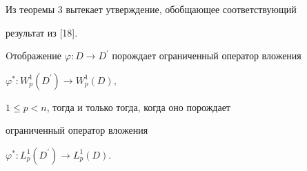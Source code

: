 Из теоремы 3 вытекает утверждение, обобщающее соответствующий


результат из [18].





\begin{cor}


Oтображение $\varphi : D\to


D^{\prime}$ порождает ограниченный оператор вложения


$\varphi^{\ast}: W^1_p(D^{\prime})\to W^1_{p}(D)$,


$1\leq p<n$, тогда и только тогда, когда оно порождает


ограниченный оператор вложения


$\varphi^{\ast} : L^1_p(D^{\prime})\to L^1_p(D)$.


\end{cor}





